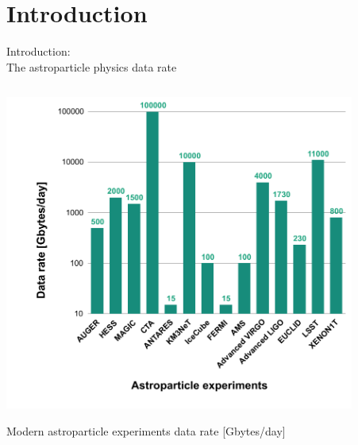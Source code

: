\section{Introduction}

\begin{frame}
\titlepage
\end{frame}

\begin{frame}{Introduction: \\The astroparticle physics data rate}
\small
\begin{columns}
  \begin{column}[t]{0.45\textwidth}
    \begin{center}
      \includegraphics[width=0.9\textwidth]{pics/appec_base4.pdf}
    \end{center}
    \vspace{-2\parsep}
    \small Modern astroparticle experiments data rate [Gbytes/day]\footnotemark[1] %
  \end{column}
  \hfill
  \begin{column}[t]{0.53\textwidth}

\end{column}
\end{columns}
\end{frame}
